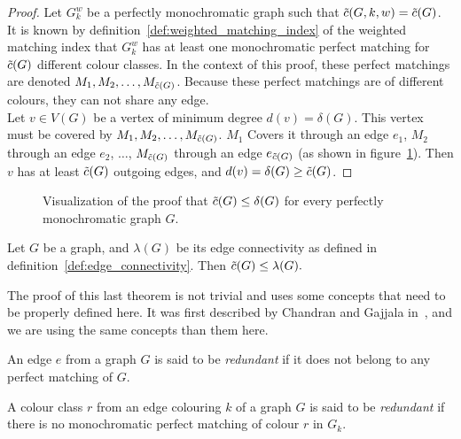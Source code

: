 \begin{proof}
    Let $G_k^w$ be a perfectly monochromatic graph such that $\Tilde{c}(G, k, w) = \Tilde{c}(G)$.
    It is known by definition~\ref{def:weighted_matching_index} of the weighted matching index that $G_k^w$ has at least one monochromatic perfect matching for $\Tilde{c}(G)$ different colour classes.
    In the context of this proof, these perfect matchings are denoted $M_1, M_2, \dots, M_{\Tilde{c}(G)}$.
    Because these perfect matchings are of different colours, they can not share any edge.\\
    
    Let $v \in V(G)$ be a vertex of minimum degree $d(v) = \delta(G)$.
    This vertex must be covered by $M_1, M_2, \dots, M_{\Tilde{c}(G)}$.
    $M_1$ Covers it through an edge $e_1$, $M_2$ through an edge $e_2$, $\dots$, $M_{\Tilde{c}(G)}$ through an edge $e_{\Tilde{c}(G)}$ (as shown in figure~\ref{fig:proof_min_degree}).
    Then $v$ has at least $\Tilde{c}(G)$ outgoing edges, and $d(v) = \delta(G) \geq \Tilde{c}(G)$.
\end{proof}

\begin{figure}[H]
    \caption{Visualization of the proof that $\Tilde{c}(G) \leq \delta(G)$ for every perfectly monochromatic graph $G$.}
    \label{fig:proof_min_degree}
\end{figure}

\begin{theorem}
    \label{thm:bound_edge_connectivity}
    Let $G$ be a graph, and $\lambda(G)$ be its edge connectivity as defined in definition~\ref{def:edge_connectivity}.
    Then $\Tilde{c}(G) \leq \lambda(G).$
\end{theorem}

The proof of this last theorem is not trivial and uses some concepts that need to be properly defined here.
It was first described by Chandran and Gajjala in~\cite{chandran}, and we are using the same concepts than them here.

\begin{definition}
    \label{def:redundant_edge}
    An edge $e$ from a graph $G$ is said to be \textit{redundant} if it does not belong to any perfect matching of $G$.
\end{definition}

\begin{definition}[Redundant colour class]      %
    \label{def:redundant_colour_class}
    A colour class $r$ from an edge colouring $k$ of a graph $G$ is said to be \textit{redundant} if there is no monochromatic perfect matching of colour $r$ in $G_k$.
\end{definition}

